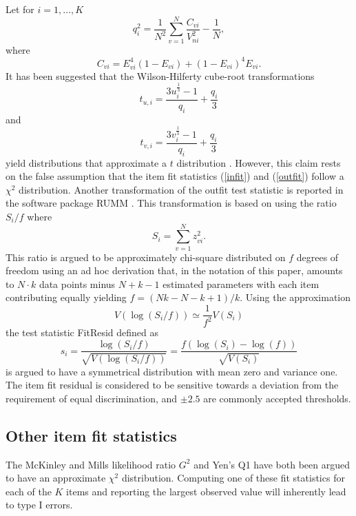 \documentclass[11pt,a4paper]{article}
\begin{document}
Let for $i=1,\ldots,K$
$$
q_i^2 = \frac{1}{N^2} \sum_{v=1}^N \frac{C_{vi}}{V_{ni}^2} - \frac1N,
$$
where
$$
C_{vi} = E_{vi}^4 (1 - E_{vi}) + (1-E_{vi})^4 E_{vi}.
$$
It has been suggested that the Wilson-Hilferty \citeyear{Wilson-Hilferty-1931} cube-root transformations
\begin{equation}\label{wilson-hilferty-OUT}
t_{u,i} = \frac{3u_i^{\frac{1}{3}} - 1}{q_i} + \frac{q_i}{3}
\end{equation}
and
\begin{equation}\label{wilson-hilferty-IN}
t_{v,i} = \frac{3v_i^{\frac{1}{3}} - 1}{q_i} + \frac{q_i}{3}
\end{equation}
yield distributions that approximate a $t$ distribution \cite[Table 5.4a, p.100]{Wright-Masters-1982}. However, this claim rests on the false assumption that the item fit statistics (\ref{infit}) and (\ref{outfit}) follow a $\chi^2$ distribution. Another transformation of the outfit test statistic is reported in the software package RUMM \cite{Andrich-Sheridan-Luo-2010}. This transformation is based on using the ratio $S_i/f$ where
\begin{equation}
S_i = \sum_{v = 1}^N z_{vi}^2.
\label{S}
\end{equation}
This ratio is argued to be approximately chi-square distributed on $f$ degrees of freedom using an ad hoc derivation that, in the notation of this paper, amounts to $N\cdot k$ data points minus $N+k-1$ estimated parameters with each item contributing equally yielding $f=(Nk-N-k+1)/k$. Using the approximation
\begin{equation}
V(\log(S_i/f))\simeq\frac1{f^2}{V(S_i)}
\end{equation}
the test statistic FitResid defined as 
\begin{equation}
s_i=\frac{\log(S_i/f)}{\sqrt{V(\log(S_i/f))}}
=\frac{f(\log(S_i)-\log(f))}{\sqrt{V(S_i)}}
\label{FitResid}
\end{equation}
is argued to have a symmetrical distribution with mean zero and variance one. The item fit residual is considered to be sensitive towards a deviation from the requirement of equal discrimination, and $\pm2.5$ are commonly accepted thresholds. 

\subsection{Other item fit statistics}

The McKinley and Mills \citeyear{McKinley-Mills-1985} likelihood ratio $G^2$ and Yen's \citeyear{Yen-1981} Q1 have both been argued to have an approximate $\chi^2$ distribution. Computing one of these fit statistics for each of the $K$ items and reporting the largest observed value will inherently lead to type I errors. 
\end{document}

